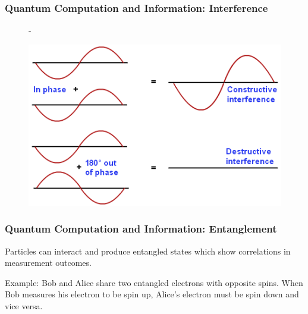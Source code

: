 \documentclass[pdf]{beamer}
\begin{document}
    \begin{frame}
        \frametitle{Quantum Computation and Information: Interference}
        \begin{figure}[ht]
            \begin{minipage}{.56\textwidth}
                - \textcite{aaronson2011quantum}
            \end{minipage}
            \hfill
            \begin{minipage}{.4\textwidth}
                \includegraphics[width=1\linewidth]{../figures/interference.png}
            \end{minipage}
        \end{figure}
    \end{frame}

    \begin{frame}
        \frametitle{Quantum Computation and Information: Entanglement}
        Particles can interact and produce entangled states which show correlations in measurement outcomes.
        
        \vfill
        
        Example: Bob and Alice share two entangled electrons with opposite spins. When Bob measures his electron to be spin up, Alice's electron must be spin down and vice versa.
    \end{frame}
\end{document}
